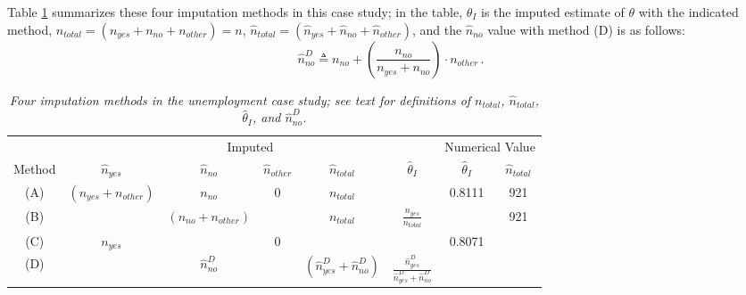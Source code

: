 \documentclass[12pt]{article}
\begin{document}
\begin{itemize}
\begin{itemize}
\end{itemize}

Table \ref{t:imputation-1} summarizes these four imputation methods in this case study; in the table, $\hat{ \theta }_I$ is the imputed estimate of $\theta$ with the indicated method, $n_{ total } = ( n_{ yes } + n_{ no } + n_{ other } ) = n$, $\hat{ n }_{ total } = ( \hat{ n }_{ yes } + \hat{ n }_{ no } + \hat{ n }_{ other } )$, and the $\hat{ n }_{ no }$ value with method (D) is as follows:
\begin{equation} \label{e:proportional-1}
\hat{ n }_{ no }^D \triangleq n_{ no } + \left( \frac{ n_{ no } }{ n_{ yes } + n_{ no } } \right) \cdot n_{ other } \, .
\end{equation}

\begin{table}[t!]

\centering

\caption{\textit{Four imputation methods in the unemployment case study; see text for definitions of $n_{ total }$, $\hat{ n }_{ total }$, $\hat{ \theta }_I$, and $\hat{ n }_{ no }^D$.}}

\label{t:imputation-1}

\bigskip

\begin{tabular}{c||ccccc||cc}

& \multicolumn{5}{c||}{Imputed} & \multicolumn{2}{c}{Numerical Value} \\ \cline{2-8}

\rule{0pt}{3ex} Method & $\hat{ n }_{ yes }$ & $\hat{ n }_{ no }$ & $\hat{ n }_{ other }$ & $\hat{ n }_{ total }$ & $\hat{ \theta }_I$ & $\hat{ \theta }_I$ & $\hat{ n }_{ total }$ \\ \hline 

\rule{0pt}{3ex} (A) & $( n_{ yes } + n_{ other } )$ & $n_{ no }$ & 0 & $n_{ total }$ & & 0.8111 & 921 \\

\rule{0pt}{3ex} (B) & & $( n_{ no } + n_{ other } )$ & & $n_{ total }$ & $\frac{ n_{ yes } }{ n_{ total } }$ & & 921 \\

\rule{0pt}{3ex} (C) & $n_{ yes }$ & & 0 & & & 0.8071 & \\

\rule{0pt}{3ex} (D) & & $\hat{ n }_{ no }^D$ & & $( \hat{ n }_{ yes }^D + \hat{ n }_{ no }^D )$ & $\frac{ \hat{ n }_{ yes }^D }{ \hat{ n }_{ yes }^D + \hat{ n }_{ no }^D }$ &

\end{tabular}


\end{table}
\end{itemize}
\end{document}
